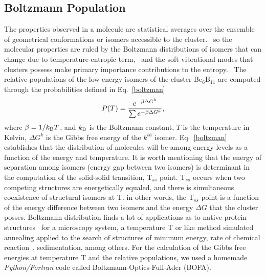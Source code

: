 \documentclass[prb,aps,preprint,showkeys,showpacs]{revtex4}
\begin{document}
\subsection{Boltzmann Population}
The properties observed in a molecule are statistical averages over the ensemble of geometrical conformations or isomers accessible to the cluster.~\cite{Teague} so the molecular properties are ruled by the Boltzmann distributions of isomers
that can change due to temperature-entropic term,~\cite{Vargas-Caamal,Bulusu,Grigoryan} and the soft vibrational modes that clusters possess make primary importance contributions to the entropy.~\cite{Malloum2} The relative populations of the low-energy isomers of the cluster Be$_6$B$_{11}^{-}$ are computed through the probabilities defined in Eq.~\ref{boltzman}
\begin{equation}
\centering 
\displaystyle
P(T)=\frac{e^{-\beta \Delta G^{k}}}{\sum e^{-\beta \Delta G^{k}}}\label{boltzman}, 
\end{equation}
where $\beta=1/k_{\textup{B}}T$, and $k_{\textup{B}}$ is the Boltzmann constant, $T$ is the temperature in Kelvin, $\Delta G^{k}$ is the Gibbs free energy of the $k^{th}$ isomer. Eq.~\ref{boltzman} establishes that the distribution of molecules will be among energy levels as a function of the energy and temperature.
It is worth mentioning that the energy of separation among isomers (energy gap between two isomers) is determinant in the computation of the solid-solid transition, T$_{ss}$ point.  T$_{ss}$ occurs when two competing structures are energetically equaled, and there is simultaneous coexistence of structural isomers at T. in other words, the T$_{ss}$ point is a function of the energy difference between two isomers and the
energy $\Delta G$  that the cluster posses. Boltzmann distribution finds a lot of applications as to native protein structures~\cite{Shortle} for a microscopy system, a temperature T or like method simulated annealing applied to the search of structures of minimum energy, rate of chemical reaction~\cite{Dzib}, sedimentation, among others.  For the calculation of the Gibbs free energies at temperature T and the relative populations, we used a homemade \emph{Python/Fortran} code called Boltzmann-Optics-Full-Ader (BOFA). 
\end{document}
